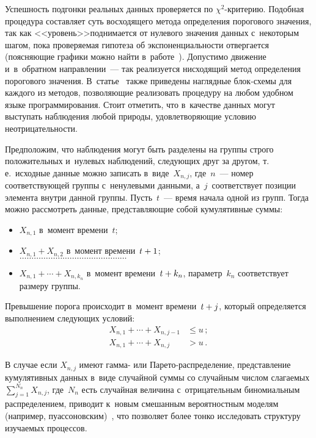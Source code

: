 \begin{multicols}{2}
Успешность подгонки реальных данных проверяется по $\chi^2$-кри\-те\-рию. 
Подобная процедура со\-став\-ля\-ет суть восходящего метода определения порогового значения, 
так как <<уровень>>поднимается от нулевого значения данных с~некоторым шагом, 
пока проверяемая гипотеза об экспоненциаль\-ности отвергается (поясняющие графики 
можно найти в~работе~\cite{Gorshenin2016CCIS1}). Допустимо движение и~в~обратном 
направлении~--- так реализуется нисходящий метод определения порогового значения.
В~статье~\cite{Gorshenin2016CCIS1} так\-же приведены наглядные блок-схе\-мы 
для каж\-до\-го из методов, поз\-во\-ля\-ющие реализовать процедуру на любом удобном 
языке программирования. Стоит отметить, что в~качестве данных могут выступать 
наблюдения любой природы, удовле\-тво\-ря\-ющие усло\-вию неотрицательности.

Предположим, что наблюдения могут быть разделены на группы строго положительных 
и~нулевых наблюдений, следующих друг за другом, т.\,е.\ 
исходные данные можно записать в~виде~$X_{n,j}$, где~$n$~--- 
номер соответствующей группы с~ненулевыми данными, а~$j$~соответствует 
позиции элемента внут\-ри данной группы. Пусть~$t$~--- время начала одной из групп. 
Тогда можно рассмотреть данные, пред\-став\-ля\-ющие собой кумулятивные суммы:
\begin{itemize}
\item $X_{n,1}$ в~момент времени~$t$;
\item  $X_{n,1}+X_{n,2}$ в~момент времени~$t\hm+1$;\\
$\ldots\ldots\ldots\ldots\ldots\ldots\ldots\ldots\ldots\ldots\ldots\ldots\ldots\ldots\ldots$
\item $X_{n,1}+\cdots+X_{n,k_n}$ в~момент времени~$t\hm+k_n$,
па\-ра\-метр~$k_n$ соответствует размеру группы.
\end{itemize}
 Превышение порога 
происходит в~момент времени~$t\hm+j$, который определяется выполнением сле\-ду\-ющих условий:
\begin{align*}
X_{n,1}+\cdots+X_{n,j-1}&\leqslant u\,;\\
X_{n,1}+\cdots+X_{n,j}&>u\,.
\end{align*}

В случае если $X_{n,j}$ имеют гамма- или Па\-ре\-то-рас\-пре\-де\-ле\-ние, 
представление кумулятивных данных в~виде случайной суммы со случайным чис\-лом 
слагаемых $\sum\nolimits_{j=1}^{N_n} X_{n,j}$, где~$N_n$ есть 
случайная величина с~отрицательным биномиальным распределением, приводит к~новым 
смешанным вероятностным моделям (например, пуассоновским)~\cite{Korolev2011}, 
что позволяет более тонко исследовать структуру изучаемых процессов.


\end{multicols}
